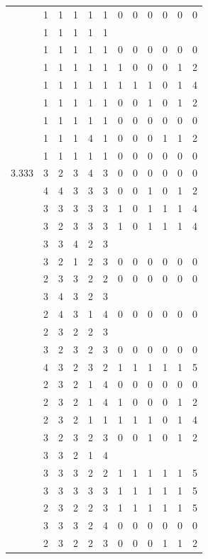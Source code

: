 \documentclass[]{book}
\theoremstyle{definition}
\theoremstyle{definition}
\theoremstyle{definition}
\theoremstyle{remark}
\begin{document}
\begin{table}
{\begin{tabular}[t]{rrrrrrrrrrrr}
 & 1 & 1 & 1 & 1 & 1 & 0 & 0 & 0 & 0 & 0 & 0\\
 & 1 & 1 & 1 & 1 & 1 &  &  &  &  &  & \\
 & 1 & 1 & 1 & 1 & 1 & 0 & 0 & 0 & 0 & 0 & 0\\
 & 1 & 1 & 1 & 1 & 1 & 1 & 0 & 0 & 0 & 1 & 2\\
 & 1 & 1 & 1 & 1 & 1 & 1 & 1 & 1 & 0 & 1 & 4\\
 & 1 & 1 & 1 & 1 & 1 & 0 & 0 & 1 & 0 & 1 & 2\\
 & 1 & 1 & 1 & 1 & 1 & 0 & 0 & 0 & 0 & 0 & 0\\
 & 1 & 1 & 1 & 4 & 1 & 0 & 0 & 0 & 1 & 1 & 2\\
 & 1 & 1 & 1 & 1 & 1 & 0 & 0 & 0 & 0 & 0 & 0\\
3.333 & 3 & 2 & 3 & 4 & 3 & 0 & 0 & 0 & 0 & 0 & 0\\
 & 4 & 4 & 3 & 3 & 3 & 0 & 0 & 1 & 0 & 1 & 2\\
 & 3 & 3 & 3 & 3 & 3 & 1 & 0 & 1 & 1 & 1 & 4\\
 & 3 & 2 & 3 & 3 & 3 & 1 & 0 & 1 & 1 & 1 & 4\\
 & 3 & 3 & 4 & 2 & 3 &  &  &  &  &  & \\
 & 3 & 2 & 1 & 2 & 3 & 0 & 0 & 0 & 0 & 0 & 0\\
 & 2 & 3 & 3 & 2 & 2 & 0 & 0 & 0 & 0 & 0 & 0\\
 & 3 & 4 & 3 & 2 & 3 &  &  &  &  &  & \\
 & 2 & 4 & 3 & 1 & 4 & 0 & 0 & 0 & 0 & 0 & 0\\
 & 2 & 3 & 2 & 2 & 3 &  &  &  &  &  & \\
 & 3 & 2 & 3 & 2 & 3 & 0 & 0 & 0 & 0 & 0 & 0\\
 & 4 & 3 & 2 & 3 & 2 & 1 & 1 & 1 & 1 & 1 & 5\\
 & 2 & 3 & 2 & 1 & 4 & 0 & 0 & 0 & 0 & 0 & 0\\
 & 2 & 3 & 2 & 1 & 4 & 1 & 0 & 0 & 0 & 1 & 2\\
 & 2 & 3 & 2 & 1 & 1 & 1 & 1 & 1 & 0 & 1 & 4\\
 & 3 & 2 & 3 & 2 & 3 & 0 & 0 & 1 & 0 & 1 & 2\\
 & 3 & 3 & 2 & 1 & 4 &  &  &  &  &  & \\
 & 3 & 3 & 3 & 2 & 2 & 1 & 1 & 1 & 1 & 1 & 5\\
 & 3 & 3 & 3 & 3 & 3 & 1 & 1 & 1 & 1 & 1 & 5\\
 & 2 & 3 & 2 & 2 & 3 & 1 & 1 & 1 & 1 & 1 & 5\\
 & 3 & 3 & 3 & 2 & 4 & 0 & 0 & 0 & 0 & 0 & 0\\
 & 2 & 3 & 2 & 2 & 3 & 0 & 0 & 0 & 1 & 1 & 2\\

\end{tabular}}
\end{table}
\end{document}
